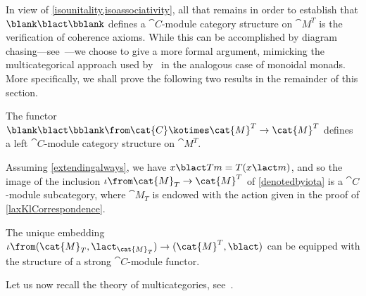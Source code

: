 In view of \cref{isounitality,isoassociativity},
all that remains in order to establish that \(\blank \blact \bblank\) defines a \(\cat{C}\)\hyp{}module category structure on \(\cat{M}^T\) is the verification of coherence axioms.
While this can be accomplished by diagram chasing—see~\cite[Theorem~2.6.4]{seal13:tensor}—we choose to give a more formal argument,
mimicking the multicategorical approach used by~\cite{aguiar18:monad} in the analogous case of monoidal monads.
More specifically, we shall prove the following two results in the remainder of this section.

\begin{theorem}\label{extendingalways}
 The functor \(\blank \blact \bblank \from \cat{C} \kotimes \cat{M}^T \to \cat{M}^T\) defines a left \(\cat{C}\)\hyp{}module category structure on \(\cat{M}^T\).
\end{theorem}

Assuming \cref{extendingalways},
we have \(x \blact Tm = T(x \lact m)\),
and so the image of the inclusion \(\iota\from \cat{M}_T \to \cat{M}^T\) of \cref{denotedbyiota}
is a \(\cat{C}\)\hyp{}module subcategory,
where \(\cat{M}_T\) is endowed with the action given in the proof of \cref{laxKlCorrespondence}.

\begin{theorem}\label{strongembeddingalways}
 The unique embedding \(\iota \from (\cat{M}_T, \lact_{\cat{M}_T}) \to (\cat{M}^T, \blact)\) can be equipped with the structure of a strong \(\cat{C}\)\hyp{}module functor.
\end{theorem}

Let us now recall the theory of multicategories,
see~\cite{hermida00:repres,leinster04:higher}.

